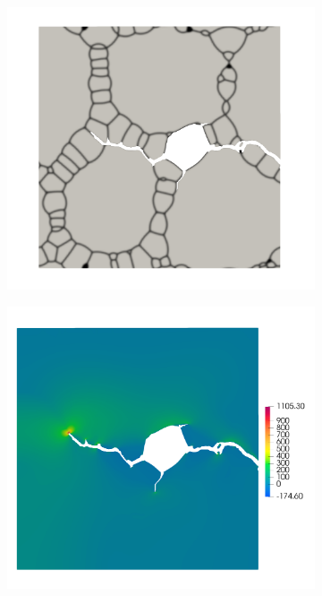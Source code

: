 \begin{figure}[htb!]
  \centering
  \begin{subfigure}[t]{0.4\linewidth}
    \centering
    \includegraphics[width=\linewidth]{Chapter3/figures/partial_hbs_1}
    \caption{}
  \end{subfigure}
  \begin{subfigure}[t]{0.4\linewidth}
    \centering
    \includegraphics[width=\linewidth]{Chapter3/figures/partial_hbs_1_stress}

\end{subfigure}
\end{figure}
